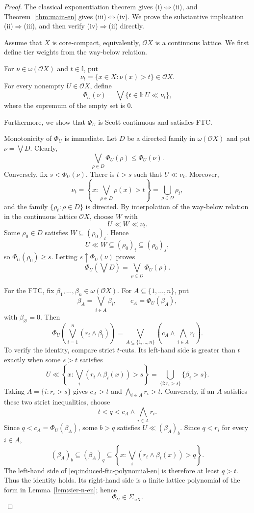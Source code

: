 \documentclass[11pt,a4paper]{article}
\numberwithin{equation}{section}
\theoremstyle{definition}
\theoremstyle{remark}
\newcommand{\I}{\mathbb I}
\newcommand{\const}[1]{\underline{#1}}
\begin{document}
\begin{proof}
The classical exponentiation theorem gives
(i)\(\Leftrightarrow\)(ii), and Theorem~\ref{thm:main-en} gives
(iii)\(\Leftrightarrow\)(iv).  We prove the substantive implication
(ii)\(\Rightarrow\)(iii), and then verify
(iv)\(\Rightarrow\)(ii) directly.

Assume that $X$ is core-compact, equivalently, \(\mathcal OX\) is a
 continuous lattice. We first define tier weights from the way-below relation.

For \(\nu\in\omega(\mathcal OX)\) and \(t\in\I\), put
\[
 \nu_t=\{x\in X:\nu(x)>t\}\in\mathcal OX.
\]
For every nonempty \(U\in\mathcal OX\), define
\begin{equation}\label{eq:induced-weight-en}
 \Phi_U(\nu)
 =\bigvee\{t\in\I:U\ll\nu_t\},
\end{equation}
where the supremum of the empty set is \(0\).

Furthermore, we show that $\Phi_U$ is Scott continuous and satisfies FTC.

Monotonicity of $\Phi_U$ is immediate.  Let \(D\) be a directed family in
\(\omega(\mathcal OX)\) and put \(\nu=\bigvee D\).  Clearly,
\[
 \bigvee_{\rho\in D}\Phi_U(\rho)\leq\Phi_U(\nu).
\]
Conversely, fix \(s<\Phi_U(\nu)\).  There is \(t>s\) such that
\(U\ll\nu_t\).  Moreover,
\[
 \nu_t
 =\left\{x:\bigvee_{\rho\in D}\rho(x)>t\right\}
 =\bigcup_{\rho\in D}\rho_t,
\]
and the family \(\{\rho_t:\rho\in D\}\) is directed.  By interpolation
of the way-below relation in the continuous lattice \(\mathcal OX\),
choose \(W\) with
\[
 U\ll W\ll\nu_t.
\]
Some \(\rho_0\in D\) satisfies \(W\subseteq(\rho_0)_t\).  Hence
\[
 U\ll W\subseteq(\rho_0)_t\subseteq(\rho_0)_s,
\]
so \(\Phi_U(\rho_0)\geq s\).  Letting
\(s\uparrow\Phi_U(\nu)\) proves
\[
 \Phi_U\left(\bigvee D\right)
 =\bigvee_{\rho\in D}\Phi_U(\rho).
\]

For the FTC, fix \(\beta_1,\ldots,\beta_n\in\omega(\mathcal OX)\).  For
\(A\subseteq\{1,\ldots,n\}\), put
\[
 \beta_A=\bigvee_{i\in A}\beta_i,\qquad
 c_A=\Phi_U(\beta_A),
\]
with \(\beta_\varnothing=0\).  Then
\begin{equation}\label{eq:induced-ftc-polynomial-en}
 \Phi_U\left(\bigvee_{i=1}^n
       (\const{r_i}\wedge\beta_i)\right)
 =
 \bigvee_{A\subseteq\{1,\ldots,n\}}
 \left(c_A\wedge\bigwedge_{i\in A}r_i\right).
\end{equation}
To verify the identity, compare strict \(t\)-cuts.  Its left-hand side
is greater than \(t\) exactly when some \(s>t\) satisfies
\[
 U\ll
 \left\{x:\bigvee_i(r_i\wedge\beta_i(x))>s\right\}
 =
 \bigcup_{\{i:r_i>s\}}\{\beta_i>s\}.
\]
Taking \(A=\{i:r_i>s\}\) gives
\(c_A>t\) and \(\bigwedge_{i\in A}r_i>t\).  Conversely, if an \(A\)
satisfies these two strict inequalities, choose
\[
 t<q<c_A\wedge\bigwedge_{i\in A}r_i.
\]
Since \(q<c_A=\Phi_U(\beta_A)\), some \(b>q\) satisfies
\(U\ll(\beta_A)_b\).  Since \(q<r_i\) for every \(i\in A\),
\[
 (\beta_A)_b\subseteq(\beta_A)_q
 \subseteq
 \left\{x:\bigvee_i(r_i\wedge\beta_i(x))>q\right\}.
\]
The left-hand side of \eqref{eq:induced-ftc-polynomial-en} is therefore
at least \(q>t\).  Thus the identity holds.  Its right-hand
side is a finite lattice polynomial of the form in
Lemma~\ref{lem:sier-n-en}; hence
\[
 \Phi_U\in\Sigma_{\omega X}.
\]


\end{proof}
\end{document}
